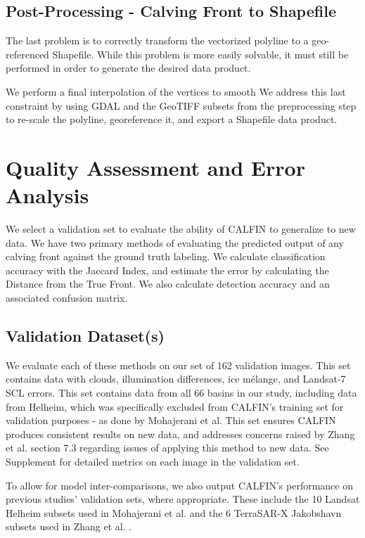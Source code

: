 \documentclass[tc, manuscript]{copernicus}
\begin{document}
\subsection{Post-Processing - Calving Front to Shapefile}
The last problem is to correctly transform the vectorized polyline to a geo-referenced Shapefile. While this problem is more easily solvable, it must still be performed in order to generate the desired data product. 

We perform a final interpolation of the vertices to smooth We address this last constraint by using GDAL and the GeoTIFF subsets from the preprocessing step to re-scale the polyline, georeference it, and export a Shapefile data product.


\section{Quality Assessment and Error Analysis}
We select a validation set to evaluate the ability of CALFIN to generalize to new data. We have two primary methods of evaluating the predicted output of any calving front against the ground truth labeling. We calculate classification accuracy with the Jaccard Index, and estimate the error by calculating the Distance from the True Front. We also calculate detection accuracy and an associated confusion matrix.

\subsection{Validation Dataset(s)}
We evaluate each of these methods on our set of 162 validation images. This set contains data with clouds, illumination differences, ice mélange, and Landsat-7 SCL errors. This set contains data from all 66 basins in our study, including data from Helheim, which was specifically excluded from CALFIN's training set for validation purposes - as done by Mohajerani et al. This set ensures CALFIN produces consistent results on new data, and addresses concerns raised by Zhang et al. section 7.3 regarding issues of applying this method to new data. See Supplement for detailed metrics on each image in the validation set.

To allow for model inter-comparisons, we also output CALFIN's performance on previous studies' validation sets, where appropriate. These include the 10 Landsat Helheim subsets used in Mohajerani et al. \citep{mohajerani2019} and the 6 TerraSAR-X Jakobshavn subsets used in Zhang et al. \citep{zhang2019}.
\end{document}
